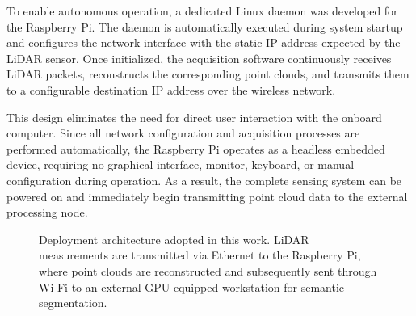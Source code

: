 To enable autonomous operation, a dedicated Linux daemon was developed for the Raspberry Pi. The daemon is automatically executed during system startup and configures the network interface with the static IP address expected by the LiDAR sensor. Once initialized, the acquisition software continuously receives LiDAR packets, reconstructs the corresponding point clouds, and transmits them to a configurable destination IP address over the wireless network.

This design eliminates the need for direct user interaction with the onboard computer. Since all network configuration and acquisition processes are performed automatically, the Raspberry Pi operates as a headless embedded device, requiring no graphical interface, monitor, keyboard, or manual configuration during operation. As a result, the complete sensing system can be powered on and immediately begin transmitting point cloud data to the external processing node.

\begin{figure}[htbp]
\centering
{}

\caption{Deployment architecture adopted in this work. LiDAR measurements are transmitted via Ethernet to the Raspberry Pi, where point clouds are reconstructed and subsequently sent through Wi-Fi to an external GPU-equipped workstation for semantic segmentation.}
\label{fig:deployment_architecture}
\end{figure}

